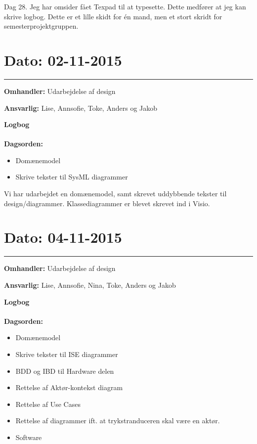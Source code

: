Dag 28. Jeg har omsider fået Texpad til at typesette. Dette medfører at jeg kan skrive logbog. Dette er et lille skidt for én mand, men et stort skridt for semesterprojektgruppen.




\section{Dato: 02-11-2015 }
\hrule

\textbf{Omhandler:} Udarbejdelse af design  

\textbf{Ansvarlig:} Lise, Annsofie, Toke, Anders og Jakob

\textbf{Logbog}
\\
\\
\textbf{Dagsorden:}
\begin{itemize}
	\item Domænemodel
	\item Skrive tekster til SysML diagrammer
\end{itemize}

Vi har udarbejdet en domænemodel, samt skrevet uddybbende tekster til design/diagrammer. 
Klassediagrammer er blevet skrevet ind i Visio. 




\section{Dato: 04-11-2015 }
\hrule

\textbf{Omhandler:} Udarbejdelse af design  

\textbf{Ansvarlig:} Lise, Annsofie, Nina, Toke, Anders og Jakob

\textbf{Logbog}
\\
\\
\textbf{Dagsorden:}
\begin{itemize}
	\item Domænemodel
	\item Skrive tekster til ISE diagrammer
	\item BDD og IBD til Hardware delen
	\item Rettelse af Aktør-kontekst diagram
	\item Rettelse af Use Cases
	\item Rettelse af diagrammer ift. at trykstranduceren skal være en aktør.
	\item Software
\end{itemize}

